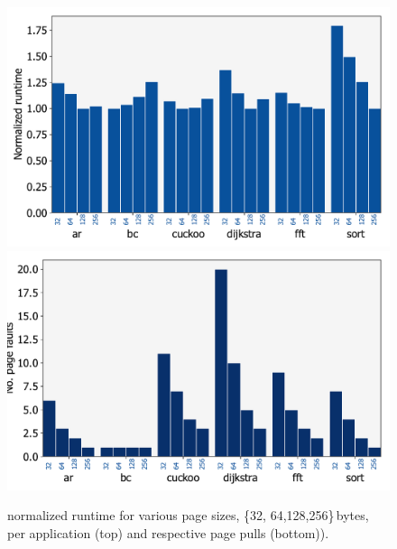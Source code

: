 \begin{figure}
	\centering
	\includegraphics[width=0.49\columnwidth]{figures/page_exec-time}
	\includegraphics[width=0.49\columnwidth]{figures/pagePulls}
	\caption{\sys normalized runtime for various page sizes, \{32, 64,128,256\}\,bytes, per application (top) and respective page pulls (bottom)).}
	\label{fig:page_size}
\end{figure}

%
%

